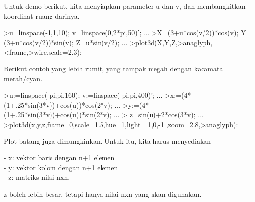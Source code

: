 \documentclass[a4paper,10pt]{article}
\begin{document}
\begin{eulernotebook}
\begin{eulercomment}
Untuk demo berikut, kita menyiapkan parameter u dan v, dan membangkitkan koordinat ruang darinya.
\end{eulercomment}
\begin{eulerprompt}
>u=linspace(-1,1,10); v=linspace(0,2*pi,50)'; ...
>X=(3+u*cos(v/2))*cos(v); Y=(3+u*cos(v/2))*sin(v); Z=u*sin(v/2); ...
>plot3d(X,Y,Z,>anaglyph,<frame,>wire,scale=2.3):
\end{eulerprompt}
\begin{eulercomment}
Berikut contoh yang lebih rumit, yang tampak megah dengan kacamata merah/cyan.
\end{eulercomment}
\begin{eulerprompt}
>u:=linspace(-pi,pi,160); v:=linspace(-pi,pi,400)';  ...
>x:=(4*(1+.25*sin(3*v))+cos(u))*cos(2*v); ...
>y:=(4*(1+.25*sin(3*v))+cos(u))*sin(2*v); ...
> z=sin(u)+2*cos(3*v); ...
>plot3d(x,y,z,frame=0,scale=1.5,hue=1,light=[1,0,-1],zoom=2.8,>anaglyph):
\end{eulerprompt}
\begin{eulercomment}
Plot batang juga dimungkinkan. Untuk itu, kita harus menyediakan

- x: vektor baris dengan n+1 elemen\\
- y: vektor kolom dengan n+1 elemen\\
- z: matriks nilai nxn.

z boleh lebih besar, tetapi hanya nilai nxn yang akan digunakan.


\end{eulercomment}
\end{eulernotebook}
\end{document}
